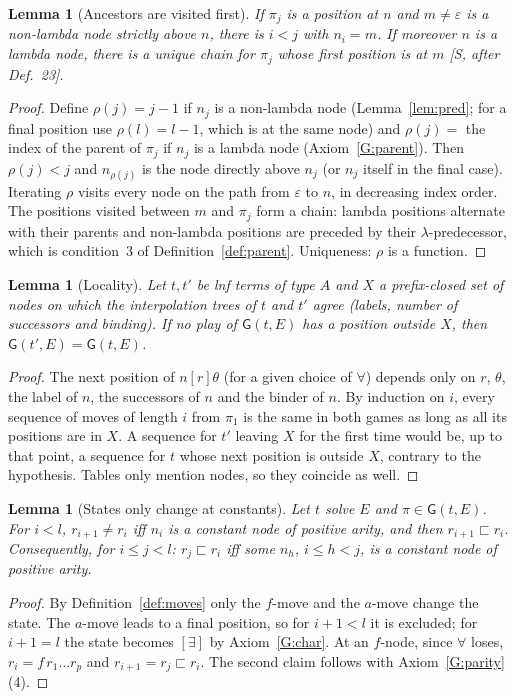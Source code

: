 \documentclass[11pt]{article}
\newcommand{\Gm}{\mathsf{G}}
\newcommand{\ssq}{\sqsubset}
\theoremstyle{plain}
\newtheorem{lemma}[theorem]{Lemma}
\theoremstyle{definition}
\theoremstyle{remark}
\begin{document}
\begin{lemma}[Ancestors are visited first]\label{lem:ancestors}
If $\pi_j$ is a position at $n$ and $m\ne\varepsilon$ is a non-lambda node
strictly above $n$, there is $i<j$ with $n_i=m$.  If moreover $n$ is a
lambda node, there is a unique chain for $\pi_j$ whose first position is
at $m$ [S, after Def.~23].
\end{lemma}
\begin{proof}
Define $\rho(j)=j-1$ if $n_j$ is a non-lambda node (Lemma~\ref{lem:pred};
for a final position use $\rho(l)=l-1$, which is at the same node) and
$\rho(j)=$ the index of the parent of $\pi_j$ if $n_j$ is a lambda node
(Axiom~\ref{G:parent}).  Then $\rho(j)<j$ and $n_{\rho(j)}$ is the node
directly above $n_j$ (or $n_j$ itself in the final case).  Iterating
$\rho$ visits every node on the path from $\varepsilon$ to $n$, in
decreasing index order.  The positions visited between $m$ and $\pi_j$
form a chain: lambda positions alternate with their parents and
non-lambda positions are preceded by their $\lambda$-predecessor, which
is condition~3 of Definition~\ref{def:parent}.  Uniqueness: $\rho$ is a
function.
\end{proof}

\begin{lemma}[Locality]\label{lem:locality}
Let $t,t'$ be lnf terms of type $A$ and $X$ a prefix-closed set of nodes
on which the interpolation trees of $t$ and $t'$ agree (labels, number
of successors and binding).  If no play of $\Gm(t,E)$ has a position
outside $X$, then $\Gm(t',E)=\Gm(t,E)$.
\end{lemma}
\begin{proof}
The next position of $n[r]\theta$ (for a given choice of $\forall$)
depends only on $r$, $\theta$, the label of $n$, the successors of $n$
and the binder of $n$.  By induction on $i$, every sequence of moves of
length $i$ from $\pi_1$ is the same in both games as long as all its
positions are in $X$.  A sequence for $t'$ leaving $X$ for the first
time would be, up to that point, a sequence for $t$ whose next position
is outside $X$, contrary to the hypothesis.  Tables only mention nodes,
so they coincide as well.
\end{proof}

\begin{lemma}[States only change at constants]\label{lem:states}
Let $t$ solve $E$ and $\pi\in\Gm(t,E)$.  For $i<l$, $r_{i+1}\ne r_i$ iff
$n_i$ is a constant node of positive arity, and then
$r_{i+1}\ssq r_i$.  Consequently, for $i\le j<l$: $r_j\ssq r_i$ iff some
$n_h$, $i\le h<j$, is a constant node of positive arity.
\end{lemma}
\begin{proof}
By Definition~\ref{def:moves} only the $f$-move and the $a$-move change
the state.  The $a$-move leads to a final position, so for $i+1<l$ it is
excluded; for $i+1=l$ the state becomes $[\exists]$ by
Axiom~\ref{G:char}.  At an $f$-node, since $\forall$ loses, $r_i=f\,r_1
\dots r_p$ and $r_{i+1}=r_j\ssq r_i$.  The second claim follows with
Axiom~\ref{G:parity}(4).
\end{proof}
\end{document}
